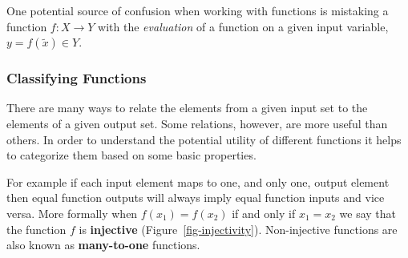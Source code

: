 \documentclass[
  letterpaper,
  DIV=11,
  numbers=noendperiod]{scrartcl}
\begin{document}
One potential source of confusion when working with functions is
mistaking a function \(f : X \rightarrow Y\) with the \emph{evaluation}
of a function on a given input variable, \(y = f(\tilde{x}) \in Y\).

\hypertarget{classifying-functions}{%
\subsubsection{Classifying Functions}\label{classifying-functions}}

There are many ways to relate the elements from a given input set to the
elements of a given output set. Some relations, however, are more useful
than others. In order to understand the potential utility of different
functions it helps to categorize them based on some basic properties.

For example if each input element maps to one, and only one, output
element then equal function outputs will always imply equal function
inputs and vice versa. More formally when \(f(x_1) = f(x_2)\) if and
only if \(x_1 = x_2\) we say that the function \(f\) is
\textbf{injective} (Figure~\ref{fig-injectivity}). Non-injective
functions are also known as \textbf{many-to-one} functions.
\end{document}
